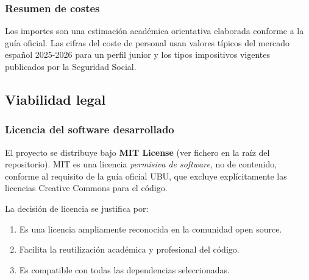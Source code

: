 
\subsubsection{Resumen de costes}


Los importes son una estimación académica orientativa elaborada conforme a la guía oficial. Las cifras del coste de personal usan valores típicos del mercado español 2025-2026 para un perfil junior y los tipos impositivos vigentes publicados por la Seguridad Social.

\subsection{Viabilidad legal}

\subsubsection{Licencia del software desarrollado}

El proyecto se distribuye bajo \textbf{MIT License} (ver fichero  en la raíz del repositorio). MIT es una licencia \emph{permisiva de software}, no de contenido, conforme al requisito de la guía oficial UBU, que excluye explícitamente las licencias Creative Commons para el código.

La decisión de licencia se justifica por:

\begin{enumerate}
    \item Es una licencia ampliamente reconocida en la comunidad open source.
    \item Facilita la reutilización académica y profesional del código.
    \item Es compatible con todas las dependencias seleccionadas.
\end{enumerate}

